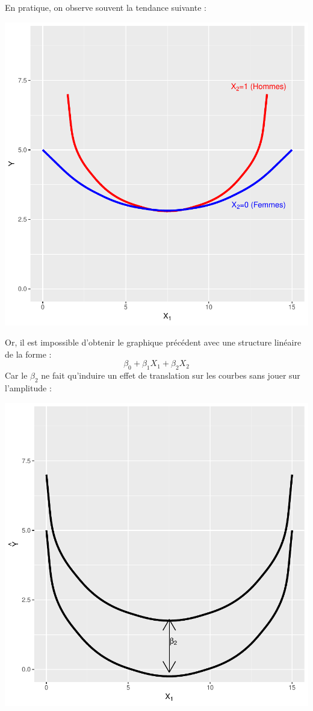 \documentclass[11pt,french]{report}
\begin{document}
En pratique, on observe souvent la tendance suivante :

\includegraphics{notes_de_cours-048}

Or, il est impossible d'obtenir le graphique précédent avec une structure linéaire de la forme :
$$
\beta_0 + \beta_1X_1 + \beta_2X_2
$$
Car le $\beta_2$ ne fait qu'induire un effet de translation sur les courbes sans jouer sur l'amplitude :

\includegraphics{notes_de_cours-049}
\end{document}
